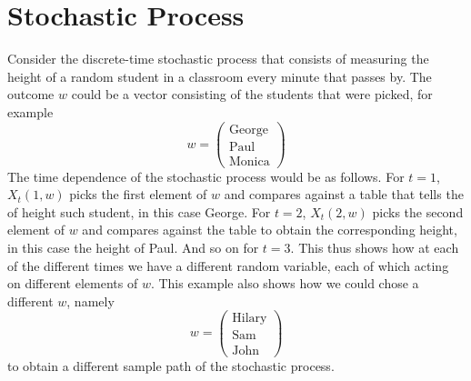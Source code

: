 \documentclass[11pt]{article}
\begin{document}
\section{Stochastic Process}
Consider the discrete-time stochastic process that consists of measuring the height of a random student in a classroom every minute that passes by. The outcome $w$ could be a vector consisting of the students that were picked, for example
\begin{equation}
w = \begin{pmatrix} \text{George} \\ \text{Paul} \\ \text{Monica} \end{pmatrix}
\end{equation}
The time dependence of the stochastic process would be as follows. For $t=1$, $X_t(1,w)$ picks the first element of $w$ and compares against a table that tells the of height such student, in this case George. For $t=2$, $X_t(2,w)$ picks the second element of $w$ and compares against the table to obtain the corresponding height, in this case the height of Paul. And so on for $t=3$. This thus shows how at each of the different times we have a different random variable, each of which acting on different elements of $w$.  This example also shows how we could chose a different $w$, namely
\begin{equation}
w = \begin{pmatrix} \text{Hilary} \\ \text{Sam} \\ \text{John} \end{pmatrix}
\end{equation}
to obtain a different sample path of the stochastic process. 
\end{document}
